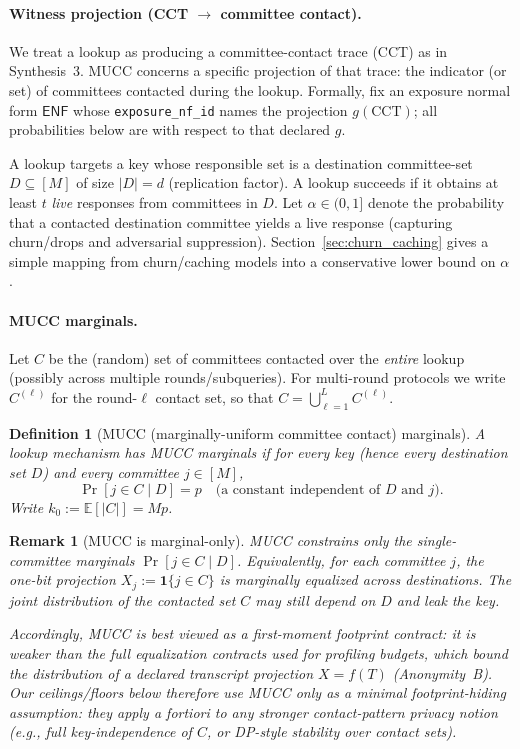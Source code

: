 \documentclass[11pt]{article}
\newtheorem{definition}{Definition}
\newtheorem{remark}{Remark}
\newcommand{\E}{\mathbb{E}}
\newcommand{\one}{\mathbf{1}}
\begin{document}
\paragraph{Witness projection (CCT $\rightarrow$ committee contact).}
We treat a lookup as producing a committee-contact trace (CCT) as in Synthesis~3.
MUCC concerns a specific projection of that trace: the indicator (or set) of committees contacted during the lookup.
Formally, fix an exposure normal form \(\mathsf{ENF}\) whose \texttt{exposure\_nf\_id} names the projection \(g(\mathrm{CCT})\); all probabilities below are with respect to that declared \(g\).

A lookup targets a key whose responsible set is a destination committee-set $D\subseteq[M]$ of size $|D|=d$ (replication factor).
A lookup succeeds if it obtains at least $t$ \emph{live} responses from committees in $D$.
Let $\alpha\in(0,1]$ denote the probability that a contacted destination committee yields a live response (capturing churn/drops and adversarial suppression).
Section~\ref{sec:churn_caching} gives a simple mapping from churn/caching models into a conservative lower bound on $\alpha$.

\paragraph{MUCC marginals.}
Let $C$ be the (random) set of committees contacted over the \emph{entire} lookup (possibly across multiple rounds/subqueries).
For multi-round protocols we write $C^{(\ell)}$ for the round-$\ell$ contact set, so that $C=\bigcup_{\ell=1}^L C^{(\ell)}$.

\begin{definition}[MUCC (marginally-uniform committee contact) marginals]
\label{def:mucc}
A lookup mechanism has \emph{MUCC marginals} if for every key (hence every destination set $D$) and every committee $j\in[M]$,
\[\Pr[j\in C\mid D] = p\quad\text{(a constant independent of $D$ and $j$)}.\]
Write $k_0 := \E[|C|] = Mp$.
\end{definition}

\begin{remark}[MUCC is marginal-only]
MUCC constrains only the \emph{single-committee} marginals $\Pr[j\in C\mid D]$.
Equivalently, for each committee $j$, the one-bit projection $X_j:=\one\{j\in C\}$ is marginally equalized across destinations.
The \emph{joint} distribution of the contacted set $C$ may still depend on $D$ and leak the key.

Accordingly, MUCC is best viewed as a \emph{first-moment footprint contract}:
it is weaker than the full equalization contracts used for profiling budgets, which bound the \emph{distribution} of a declared transcript projection $X=f(T)$ (Anonymity~B).\cite{series:profiling}
Our ceilings/floors below therefore use MUCC only as a \emph{minimal} footprint-hiding assumption:
they apply \emph{a fortiori} to any stronger contact-pattern privacy notion (e.g., full key-independence of $C$, or DP-style stability over contact sets).
\end{remark}
\end{document}
